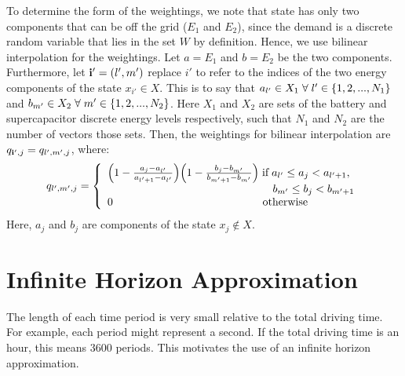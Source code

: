\documentclass[conference]{IEEEtran}
\begin{document}
To determine the form of the weightings, we note that  state has only two components that can be off the grid ($E_{1}$ and $E_{2}$), since the demand is a discrete random variable that lies in the set $W$ by definition. Hence, we use bilinear interpolation for the weightings. Let $a=E_{1}$ and $b=E_{2}$ be the two components. Furthermore, let $\bold{i'}=(l',m')$ replace $i'$ to refer to the indices of the two energy components of the state $x_{i'}\in X$. This is to say that $a_{l'}\in X_{1}\hspace{0.1cm}\forall\hspace{0.1cm}l'\in\{1,2,..., N_{1}\}$ and $b_{m'}\in X_{2}\hspace{0.1cm}\forall\hspace{0.1cm} m'\in\{1,2,..., N_{2}\}$. Here $X_{1}$ and $X_{2}$ are sets of the battery and supercapacitor discrete energy levels respectively, such that $N_{1}$ and $N_{2}$ are the number of vectors those sets. Then, the weightings for bilinear interpolation are $q_{\bold{i'},j}=q_{l',m',j}$, where:
\begin{displaymath}q_{l',m',j}=
\left\{
\begin{array}{l}
\Big(1-\frac{a_{j}-a_{l'}}{a_{l'+1}-a_{l'}}\Big)\Big(1-\frac{b_{j}-b_{m'}}{b_{m'+1}-b_{m'}}\Big)\hspace{0.1cm} \text{if} \hspace{0.1cm} a_{l'}\leq a_{j}< a_{l'+1},\\ \hspace{5.3cm}b_{m'}\leq b_{j}< b_{m'+1}\\
0		   \hspace{4.8cm} \text{otherwise}
\end{array}
\right.
\end{displaymath} Here, $a_{j}$ and $b_{j}$ are components of the state $x_{j}\not\in X$.


\section{Infinite Horizon Approximation}
The length of each time period is very small relative to the total driving time. For example, each period might represent a second. If the total driving time is an hour, this means 3600 periods. This motivates the use of an infinite horizon approximation.
\end{document}
